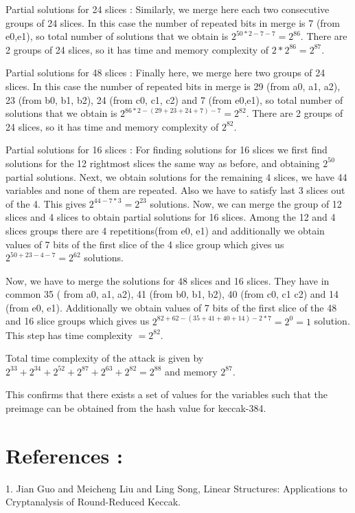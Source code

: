 \documentclass{article}
\begin{document}
\newpar
Partial solutions for 24 slices : Similarly, we merge here each two consecutive groups of 24 slices. In this case the number of repeated bits in merge is 7 (from e0,e1), so total number of solutions that we obtain is $2^{50*2 - 7 - 7 } = 2^{86}$. There are 2 groups of 24 slices, so it has time and memory complexity of $2*2^{86} = 2^{87}$.

\newpar
Partial solutions for 48 slices : Finally here, we merge here two groups of 24 slices. In this case the number of repeated bits in merge is 29 (from a0, a1, a2), 23 (from b0, b1, b2), 24 (from c0, c1, c2) and 7 (from e0,e1), so total number of solutions that we obtain is $2^{86*2 - (29 + 23 + 24 + 7) - 7 } = 2^{82}$. There are 2 groups of 24 slices, so it has time and memory complexity of $2^{82}$.

\newpar
Partial solutions for 16 slices : For finding solutions for 16 slices we first find solutions for the 12 rightmost slices the same way as before, and obtaining $2^{50}$ partial solutions. 
Next, we obtain solutions for the remaining 4 slices, we have 44 variables and none of them are repeated. Also we have to satisfy last 3 slices out of the 4. This gives $2^{44 - 7*3} = 2^{23}$ solutions.
Now, we can merge the group of 12 slices and 4 slices to obtain partial solutions for 16 slices. Among the 12 and 4 slices groups there are 4 repetitions(from e0, e1) and additionally we obtain values of 7 bits of the first slice of the 4 slice group which gives us $2^{50 + 23 - 4 -7} = 2^{62}$ solutions.

Now, we have to merge the solutions for 48 slices and 16 slices. They have in common 35 ( from a0, a1, a2), 41 (from b0, b1, b2), 40 (from c0, c1 c2) and 14 (from e0, e1). Additionally we obtain values of 7 bits of the first slice of the 48 and 16 slice groups which gives us $2^{82 + 62 - (35+ 41 + 40 + 14) - 2*7} = 2^{0} = 1$ solution. This step has time complexity $ = 2^{82}$. 

Total time complexity of the attack is given by $2^{33} + 2^{34} + 2^{52} + 2^{87} + 2^{63} + 2^{82} = 2^{88}$ and memory $2^{87}$. 

This confirms that there exists a set of values for the variables such that the preimage can be obtained from the hash value for keccak-384.

\section{References :}

1. Jian Guo and Meicheng Liu and Ling Song, Linear Structures: Applications to Cryptanalysis of Round-Reduced Keccak.\newline
\end{document}
